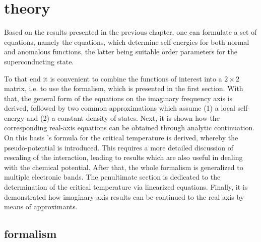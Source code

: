 
\chapter{ theory}
\label{Eliashberg theory}

Based on the results presented in the previous chapter, one can formulate a set
of equations, namely the  equations, which determine
self-energies for both normal and anomalous  functions, the latter
being suitable order parameters for the superconducting state.

To that end it is convenient to combine the  functions of interest
into a $2 \times 2$ matrix, i.e. to use the  formalism, which is
presented in the first section. With that, the general form of the
 equations on the imaginary frequency axis is derived, followed
by two common approximations which assume (1) a local self-energy and (2) a
constant density of states. Next, it is shown how the corresponding real-axis
equations can be obtained through analytic continuation. On this basis
's formula for the critical temperature is derived, whereby the
 pseudo-potential is introduced. This requires a more detailed
discussion of rescaling of the  interaction, leading to results
which are also useful in dealing with the chemical potential. After that, the
whole formalism is generalized to multiple electronic bands. The penultimate
section is dedicated to the determination of the critical temperature via
linearized  equations. Finally, it is demonstrated how
imaginary-axis results can be continued to the real axis by means of 
approximants.

\section{ formalism}


